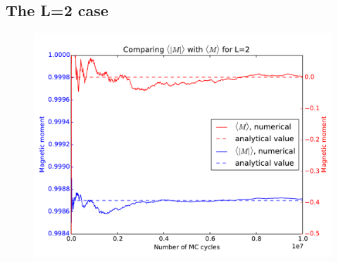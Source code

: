 



\subsection{The L=2 case}


\begin{figure}[H]
	\centering
	\includegraphics[width=0.7\linewidth]{../results/4b/L_2_mag_magabs}
	\caption{}
	\label{fig:l2magmagabs}
\end{figure}



